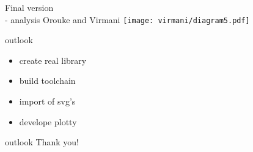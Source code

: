 \documentclass[ucs,9ptb]{beamer}
\begin{document}
\begin{frame}{Final version\\- analysis}
  Orouke and Virmani
  \texttt{[image: virmani/diagram5.pdf]}
\end{frame}

\begin{frame}{outlook}
  \begin{itemize}
    \item create real library
    \item build toolchain
    \item import of svg's
    \item develope plotty
  \end{itemize}
\end{frame}

\begin{frame}{outlook}
  \hspace{40mm}\huge{Thank you!}
\end{frame}
\end{document}
